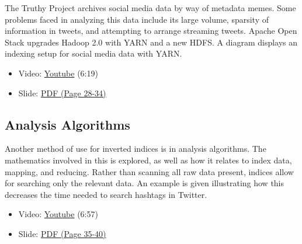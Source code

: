 The Truthy Project archives social media data by way of metadata memes.
Some problems faced in analyzing this data include its large volume,
sparsity of information in tweets, and attempting to arrange streaming
tweets. Apache Open Stack upgrades Hadoop 2.0 with YARN and a new HDFS.
A diagram displays an indexing setup for social media data with YARN.

\begin{itemize}
\tightlist
\item
  Video: \href{https://www.youtube.com/watch?v=a3tcL-Qw9to}{Youtube}
  (6:19)
\item
  Slide:
  \href{https://drive.google.com/open?id=0B88HKpainTSfWUh6dVNHcXloSnc}{PDF
  (Page 28-34)}
\end{itemize}

\subsection{Analysis Algorithms}\label{analysis-algorithms}

Another method of use for inverted indices is in analysis algorithms.
The mathematics involved in this is explored, as well as how it relates
to index data, mapping, and reducing. Rather than scanning all raw data
present, indices allow for searching only the relevant data. An example
is given illustrating how this decreases the time needed to search
hashtags in Twitter.

\begin{itemize}
\tightlist
\item
  Video: \href{https://www.youtube.com/watch?v=MxoMd4mdshE}{Youtube}
  (6:57)
\item
  Slide:
  \href{https://drive.google.com/open?id=0B88HKpainTSfWUh6dVNHcXloSnc}{PDF
  (Page 35-40)}
\end{itemize}
